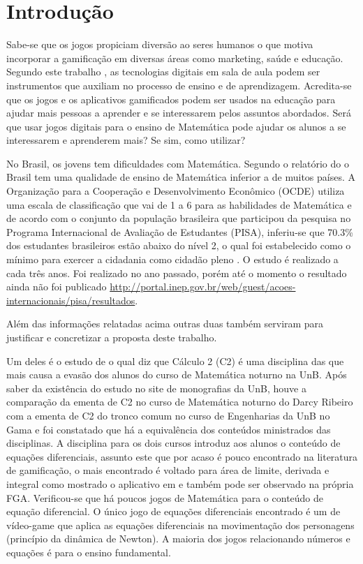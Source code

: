 \chapter[Introdução]{Introdução}


Sabe-se que os jogos propiciam diversão ao seres humanos o que motiva incorporar a gamificação em diversas áreas como marketing, saúde e educação. Segundo este trabalho \cite{revbibmatgam}, as tecnologias digitais em sala de aula podem ser instrumentos que auxiliam no processo de ensino e de aprendizagem. Acredita-se que os jogos e os aplicativos gamificados podem ser usados na educação para ajudar mais pessoas a aprender e se interessarem pelos assuntos abordados. Será que usar jogos digitais para o ensino de Matemática pode ajudar os alunos a se interessarem e aprenderem mais? Se sim, como utilizar? 

No Brasil, os jovens tem dificuldades com Matemática. Segundo o relatório do \cite{inep2015nivelcidadania} o Brasil tem uma qualidade de ensino de Matemática inferior a de muitos países. A Organização para a Cooperação e Desenvolvimento Econômico (OCDE) utiliza uma escala de classificação que vai de 1 a 6 para as habilidades de Matemática e de acordo com o conjunto da população brasileira que participou da pesquisa no Programa Internacional de Avaliação de Estudantes (PISA), inferiu-se que 70.3\% dos estudantes brasileiros estão abaixo do nível 2, o qual foi estabelecido como o mínimo para exercer a cidadania como cidadão pleno \cite{inep2015nivelcidadania}.
O estudo é realizado a cada três anos. Foi realizado no ano passado, porém até o momento o resultado ainda não foi publicado \url{http://portal.inep.gov.br/web/guest/acoes-internacionais/pisa/resultados}.

Além das informações relatadas acima outras duas também serviram para justificar e concretizar a proposta deste trabalho. 

Um deles é o estudo de \cite{evasaoC2} o qual diz que Cálculo 2 (C2) é uma disciplina das que mais causa a evasão dos alunos do curso de Matemática noturno na UnB. Após saber da existência do estudo no site de monografias da UnB, houve a comparação da ementa de C2 no curso de Matemática noturno do Darcy Ribeiro com a ementa de C2 do tronco comum no curso de Engenharias da UnB no Gama e foi constatado que há a equivalência dos conteúdos ministrados das disciplinas. A disciplina para os dois cursos introduz aos alunos o conteúdo de equações diferenciais, assunto este que por acaso é pouco encontrado na literatura de gamificação, o mais encontrado é voltado para área de limite, derivada e integral como mostrado o aplicativo em \cite{appcalculo} e também pode ser observado na própria FGA. Verificou-se que há poucos jogos de Matemática para o conteúdo de equação diferencial. O único jogo de equações diferenciais encontrado é um de vídeo-game que aplica as equações diferenciais na movimentação dos personagens (princípio da dinâmica de Newton)\cite{videoGameED}. A maioria dos jogos relacionando números e equações é para o ensino fundamental.

